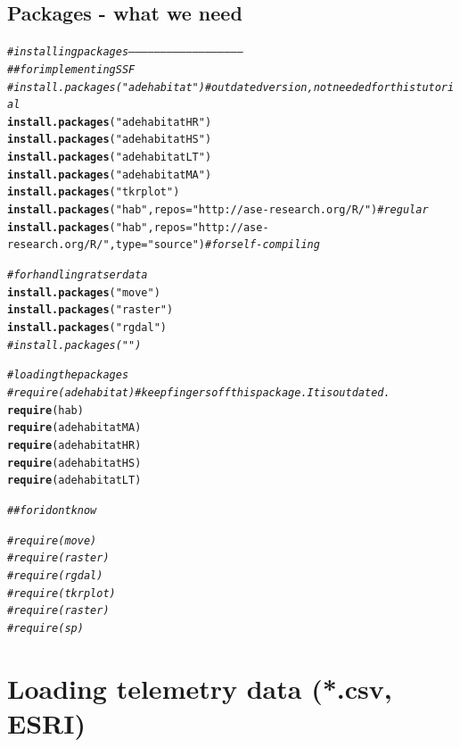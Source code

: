 \documentclass[11pt, a4paper]{article}\usepackage[]{graphicx}\usepackage[]{color}
\makeatletter
\newcommand{\hlstr}[1]{\textcolor[rgb]{0.192,0.494,0.8}{#1}}%
\newcommand{\hlcom}[1]{\textcolor[rgb]{0.678,0.584,0.686}{\textit{#1}}}%
\newcommand{\hlstd}[1]{\textcolor[rgb]{0.345,0.345,0.345}{#1}}%
\newcommand{\hlkwc}[1]{\textcolor[rgb]{0.333,0.667,0.333}{#1}}%
\newcommand{\hlkwd}[1]{\textcolor[rgb]{0.737,0.353,0.396}{\textbf{#1}}}%
\newenvironment{kframe}{%
 \def\at@end@of@kframe{}%
 \ifinner\ifhmode%
  \def\at@end@of@kframe{\end{minipage}}%
  \begin{minipage}{\columnwidth}%
 \fi\fi%
 \def\FrameCommand##1{\hskip\@totalleftmargin \hskip-\fboxsep
 \colorbox{shadecolor}{##1}\hskip-\fboxsep
     \hskip-\linewidth \hskip-\@totalleftmargin \hskip\columnwidth}%
 \MakeFramed {\advance\hsize-\width
   \@totalleftmargin\z@ \linewidth\hsize
   \@setminipage}}%
 {\par\unskip\endMakeFramed%
 \at@end@of@kframe}
\newenvironment{knitrout}{}{} %
\makeatother
\begin{document}
\subsection{Packages - what we need}

\begin{knitrout}
\color{fgcolor}\begin{kframe}
\begin{alltt}
\hlcom{# installing packages -----------------------------------------------------}
\hlcom{## for implementing SSF}
\hlcom{# install.packages("adehabitat") # outdated version, not needed for this tutorial}
\hlkwd{install.packages}\hlstd{(}\hlstr{"adehabitatHR"}\hlstd{)}
\hlkwd{install.packages}\hlstd{(}\hlstr{"adehabitatHS"}\hlstd{)}
\hlkwd{install.packages}\hlstd{(}\hlstr{"adehabitatLT"}\hlstd{)}
\hlkwd{install.packages}\hlstd{(}\hlstr{"adehabitatMA"}\hlstd{)}
\hlkwd{install.packages}\hlstd{(}\hlstr{"tkrplot"}\hlstd{)}
\hlkwd{install.packages}\hlstd{(}\hlstr{"hab"}\hlstd{,} \hlkwc{repos} \hlstd{=} \hlstr{"http://ase-research.org/R/"}\hlstd{)} \hlcom{# regular}
\hlkwd{install.packages}\hlstd{(}\hlstr{"hab"}\hlstd{,} \hlkwc{repos} \hlstd{=} \hlstr{"http://ase-research.org/R/"}\hlstd{,} \hlkwc{type} \hlstd{=} \hlstr{"source"}\hlstd{)} \hlcom{# for self-compiling}

\hlcom{# for handling ratser data}
\hlkwd{install.packages}\hlstd{(}\hlstr{"move"}\hlstd{)}
\hlkwd{install.packages}\hlstd{(}\hlstr{"raster"}\hlstd{)}
\hlkwd{install.packages}\hlstd{(}\hlstr{"rgdal"}\hlstd{)}
\hlcom{#install.packages("")}

\hlcom{# loading the packages}
\hlcom{# require(adehabitat) # keep fingers off this package. It is outdated.}
\hlkwd{require}\hlstd{(hab)}
\hlkwd{require}\hlstd{(adehabitatMA)}
\hlkwd{require}\hlstd{(adehabitatHR)}
\hlkwd{require}\hlstd{(adehabitatHS)}
\hlkwd{require}\hlstd{(adehabitatLT)}


\hlcom{## for i dont know}

\hlcom{#require(move)}
\hlcom{#require(raster)}
\hlcom{#require(rgdal)}
\hlcom{#require(tkrplot)}
\hlcom{#require(raster)}
\hlcom{#require(sp)}
\end{alltt}
\end{kframe}
\end{knitrout}



\section{Loading telemetry data (*.csv, ESRI)}%
\end{document}
